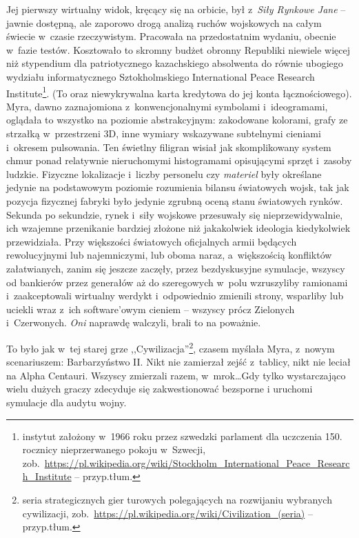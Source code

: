 \documentclass[oneside,polish,11pt,sfheadings]{mwbk}
\begin{document}
Jej pierwszy wirtualny widok, kręcący się na orbicie, był z~\textit{Siły
Rynkowe Jane} -- jawnie dostępną, ale zaporowo drogą analizą ruchów
wojskowych na całym świecie w~czasie rzeczywistym. Pracowała na
przedostatnim wydaniu, obecnie w~fazie testów. Kosztowało to skromny
budżet obronny Republiki niewiele więcej niż stypendium dla 
patriotycznego kazachskiego absolwenta do równie ubogiego wydziału
informatycznego Sztokholmskiego International Peace Research
Institute\footnote{ instytut założony w~1966 roku przez szwedzki parlament dla
uczczenia 150. rocznicy nieprzerwanego pokoju w~Szwecji,
zob.~\url{https://pl.wikipedia.org/wiki/Stockholm\_International\_Peace\_Research\_Institute}
-- przyp.tłum.}. (To oraz niewykrywalna karta kredytowa do jej konta
łącznościowego). Myra, dawno zaznajomiona z~konwencjonalnymi symbolami i~ideogramami, oglądała to wszystko na poziomie abstrakcyjnym: zakodowane
kolorami, grafy ze strzałką w~przestrzeni 3D, inne wymiary wskazywane
subtelnymi cieniami i~okresem pulsowania. Ten świetlny filigran wisiał
jak skomplikowany system chmur ponad relatywnie nieruchomymi
histogramami opisującymi sprzęt i~zasoby ludzkie. Fizyczne lokalizacje i~liczby personelu czy \textit{materiel} były określane jedynie na
podstawowym poziomie rozumienia bilansu światowych wojsk, tak jak
pozycja fizycznej fabryki było jedynie zgrubną oceną stanu światowych
rynków. Sekunda po sekundzie, rynek i~siły wojskowe przesuwały się
nieprzewidywalnie, ich wzajemne przenikanie bardziej złożone niż
jakakolwiek ideologia kiedykolwiek przewidziała. Przy większości
światowych oficjalnych armii będących rewolucyjnymi lub najemniczymi,
lub oboma naraz, a~większością konfliktów załatwianych, zanim się jeszcze zaczęły, przez
bezdyskusyjne symulacje, wszyscy od bankierów
przez generałów aż do szeregowych w~polu wzruszyliby ramionami i~zaakceptowali wirtualny werdykt i~odpowiednio zmienili strony, wsparliby
lub uciekli wraz z~ich software'owym cieniem -- wszyscy prócz Zielonych i~Czerwonych. \textit{Oni} naprawdę walczyli, brali to na poważnie.

To było jak w~tej starej grze ,,Cywilizacja''\footnote{ seria strategicznych
gier turowych polegających na rozwijaniu wybranych cywilizacji,
zob.~\url{https://pl.wikipedia.org/wiki/Civilization\_(seria)}
-- przyp.tłum.}, czasem myślała Myra, z~nowym scenariuszem:
Barbarzyństwo II. Nikt nie zamierzał zejść z~tablicy, nikt nie leciał na
Alpha Centauri. Wszyscy zmierzali razem, w~mrok\ldots Gdy tylko
wystarczająco wielu dużych graczy zdecyduje się zakwestionować bezsporne
i uruchomi symulacje dla audytu wojny.
\end{document}
